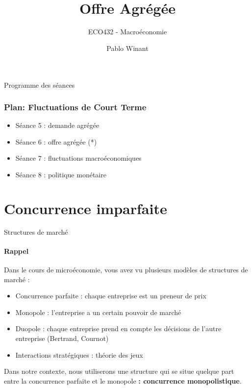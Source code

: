 \documentclass[
  ignorenonframetext,
  aspectratio=169,
]{beamer}
\title{Offre Agrégée}
\subtitle{ECO432 - Macroéconomie}
\author{Pablo Winant}
\date{}
\providecommand{\tightlist}{%
  \setlength{\itemsep}{0pt}\setlength{\parskip}{0pt}}\usepackage{longtable,booktabs,array}
\begin{document}
\frame{\titlepage}

\begin{frame}{Programme des séances}
\label{programme-des-suxe9ances}
\frametitle{Plan: Fluctuations de Court Terme}

\begin{itemize}
\tightlist
\item
  Séance 5 : demande agrégée
\item
  Séance 6 : offre agrégée (*)
\item
  Séance 7 : fluctuations macroéconomiques
\item
  Séance 8 : politique monétaire
\end{itemize}
\end{frame}

\begin{frame}
\tableofcontents
\end{frame}

\section{Concurrence imparfaite}\label{concurrence-imparfaite}

\begin{frame}{Structures de marché}
\label{structures-de-marchuxe9}
\framesubtitle{Rappel}

Dans le cours de microéconomie, vous avez vu plusieurs modèles de
structures de marché :

\begin{itemize}
\tightlist
\item
  Concurrence parfaite : chaque entreprise est un preneur de prix
\item
  Monopole : l'entreprise a un certain pouvoir de marché
\item
  Duopole : chaque entreprise prend en compte les décisions de l'autre
  entreprise (Bertrand, Cournot)
\item
  Interactions stratégiques : théorie des jeux
\end{itemize}

Dans notre contexte, nous utiliserons une structure qui se situe quelque
part entre la concurrence parfaite et le monopole \textbf{: concurrence
monopolistique}.
\end{frame}
\end{document}
